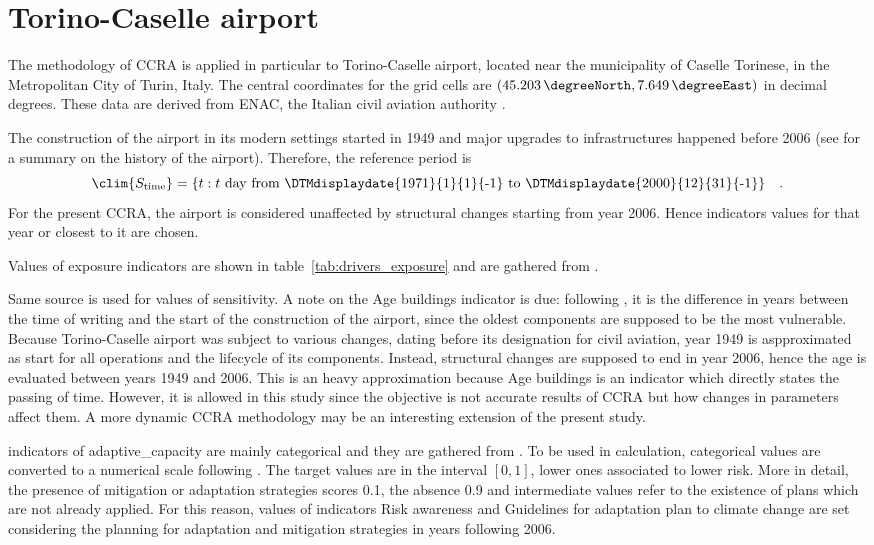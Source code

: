 \section{Torino-Caselle airport}
The methodology of \gls{CCRA} is applied in particular to Torino-Caselle airport, located near the municipality of Caselle Torinese, in the Metropolitan City of Turin, Italy.
The central coordinates for the grid cells are $(\qty{45.203}{\degreeNorth}, \qty{7.649}{\degreeEast})$ in decimal degrees. These data are derived from \gls{ENAC}, the Italian civil aviation authority \cite{2014ENACTorinoCaselle}.

The construction of the airport in its modern settings started in 1949 and major upgrades to infrastructures happened before 2006 (see \cite[18]{2015PudduCorporateSocial} for a summary on the history of the airport). Therefore, the reference period is
\begin{equation}
  \label{eq:period_reference_torino}
  \clim{S_\text{time}} = \{ t : \text{$t$ day from \DTMdisplaydate{1971}{1}{1}{-1} to \DTMdisplaydate{2000}{12}{31}{-1}} \}
  \quad .
\end{equation}
For the present \gls{CCRA}, the airport is considered unaffected by structural changes starting from year 2006. Hence \glspl{indicator} values for that year or closest to it are chosen.

Values of \gls{exposure} indicators are shown in table~\ref{tab:drivers_exposure} and are gathered from \cite[154-179]{2010OneWorksAtlanteDegli}.

Same source is used for values of \gls{sensitivity}. A note on the {Age buildings} indicator is due: following \cite[5]{2022DeVivoRiskAssessment}, it is the difference in years between the time of writing and the start of the construction of the airport, since the oldest components are supposed to be the most vulnerable. Because Torino-Caselle airport was subject to various changes, dating before its designation for civil aviation, year 1949 is aspproximated as start for all operations and the lifecycle of its components. Instead, structural changes are supposed to end in year 2006, hence the age is evaluated between years 1949 and 2006. This is an heavy approximation because {Age buildings} is an indicator which directly states the passing of time. However, it is allowed in this study since the objective is not accurate results of \gls{CCRA} but how changes in parameters affect them. A more dynamic \gls{CCRA} methodology may be an interesting extension of the present study.

\Glspl{indicator} of \gls{adaptive_capacity} are mainly categorical and they are gathered from \cite[66-79]{2015PudduCorporateSocial}. To be used in calculation, categorical values are converted to a numerical scale following \cite[6]{2023DeVivoClimate-RiskAssessment}. The target values are in the interval $[0, 1]$, lower ones associated to lower \gls{risk}. More in detail, the presence of mitigation or adaptation strategies scores \num{0.1}, the absence \num{0.9} and intermediate values refer to the existence of plans which are not already applied. For this reason, values of indicators {Risk awareness} and {Guidelines for adaptation plan to climate change} are set considering the planning for adaptation and mitigation strategies in years following 2006.
